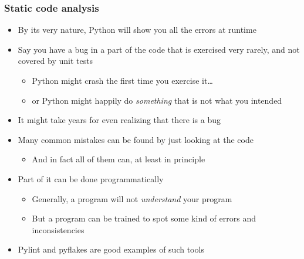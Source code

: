 \documentclass[9pt]{beamer}
\begin{document}
\begin{frame}
  \frametitle{Static code analysis}
  \begin{itemize}
  \item By its very nature, Python will show you all the errors at runtime
  \item Say you have a bug in a part of the code that is exercised very rarely,
    and not covered by unit tests
    \begin{itemize}
    \item Python might crash the first time you exercise it\ldots
    \item or Python might happily do \emph{something} that is not what you
      intended
    \end{itemize}
  \item \alert{It might take years for even realizing that there is a bug}
  \item Many common mistakes can be found by just looking at the code
    \begin{itemize}
    \item And in fact all of them can, at least in principle
    \end{itemize}
  \item Part of it can be done programmatically
    \begin{itemize}
    \item Generally, a program will not \emph{understand} your program
    \item But a program can be trained to spot some kind of
      errors and inconsistencies
    \end{itemize}
  \item Pylint and pyflakes are good examples of such tools
  \end{itemize}
\end{frame}
\end{document}
